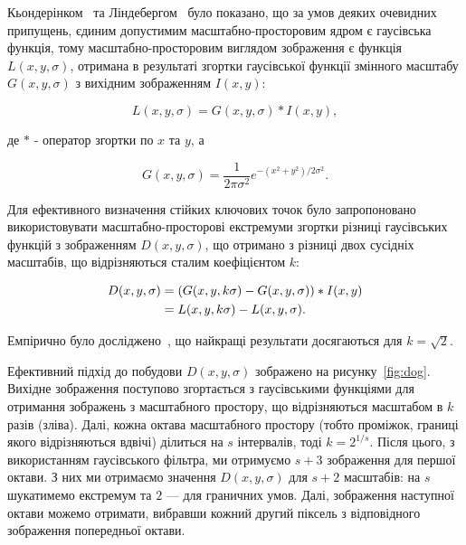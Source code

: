 Кьондерінком~\cite{Koenderink84} та Ліндебергом~\cite{Lindeberg94scale-spacetheory} було показано, що за умов деяких очевидних припущень, єдиним допустимим масштабно-просторовим ядром є гаусівська функція, тому масштабно-просторовим виглядом зображення є функція $L(x, y, \sigma)$, отримана в результаті згортки гаусівської функції змінного масштабу $G(x,y,\sigma)$ з вихідним зображенням $I(x,y)$:

\begin{equation}
  L(x,y,\sigma) = G(x,y,\sigma) \ast I(x,y),
\end{equation}

де $\ast$ - оператор згортки по $x$ та $y$, а

\begin{equation}
  G(x,y,\sigma) = \frac{1}{2\pi\sigma^2}e^{-(x^2+y^2)/2\sigma^2}.
\end{equation}

Для ефективного визначення стійких ключових точок було запропоновано~\cite{Lowe99objectrec} використовувати масштабно-просторові екстремуми згортки різниці гаусівських функцій з зображенням $D(x,y,\sigma)$, що отримано з різниці двох сусідніх масштабів, що відрізняються сталим коефіцієнтом $k$:

\begin{align}
  \label{eq:dog-scale}
    D(x,y,\sigma) & = (G(x,y,k\sigma) - G(x,y,\sigma)) \ast I(x,y) \notag\\
                  & = L(x,y,k\sigma) - L(x,y,\sigma).
\end{align}


Емпірично було досліджено~\cite{Lowe2004}, що найкращі результати досягаються для $k=\sqrt2$.

Ефективний підхід до побудови $D(x,y,\sigma)$ зображено на рисунку~\ref{fig:dog}. Вихідне зображення поступово згортається з гаусівськими функціями для отримання зображень з масштабного простору, що відрізняються масштабом в $k$ разів (зліва). Далі, кожна октава масштабного простору (тобто проміжок, границі якого відрізняються вдвічі) ділиться на $s$ інтервалів, тоді $k = 2^{1/s}$. Після цього, з використанням гаусівського фільтра, ми отримуємо $s+3$ зображення для першої октави. З них ми отримаємо значення $D(x,y,\sigma)$ для $s+2$ масштабів: на $s$ шукатимемо екстремум та $2$ --- для граничних умов. Далі, зображення наступної октави можемо отримати, вибравши кожний другий піксель з відповідного зображення попередньої октави.

